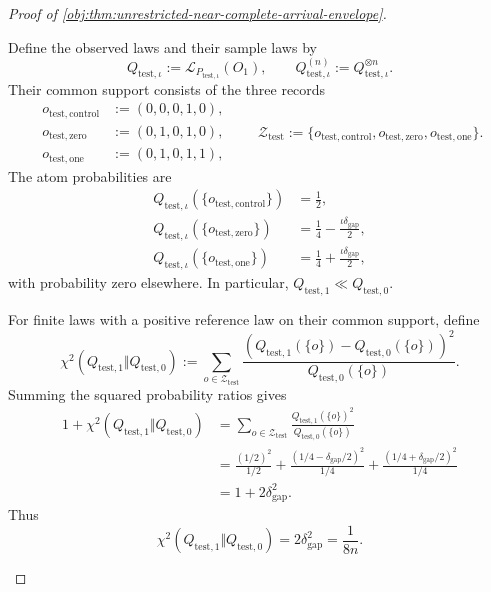 \documentclass[11pt]{article}
\begin{document}
\begin{proof}[Proof of \cref{obj:thm:unrestricted-near-complete-arrival-envelope}]
\begin{enumerate}
Define the observed laws and their sample laws by
\[
Q_{\mathrm{test},\iota}
:=\mathcal L_{P_{\mathrm{test},\iota}}(O_1),
\qquad
Q_{\mathrm{test},\iota}^{(n)}
:=Q_{\mathrm{test},\iota}^{\otimes n}.
\]
Their common support consists of the three records
\[
\begin{aligned}
o_{\mathrm{test},\mathrm{control}}&:=(0,0,0,1,0),\\
o_{\mathrm{test},\mathrm{zero}}&:=(0,1,0,1,0),\\
o_{\mathrm{test},\mathrm{one}}&:=(0,1,0,1,1),
\end{aligned}
\qquad
\mathcal Z_{\mathrm{test}}
:=
\{o_{\mathrm{test},\mathrm{control}},
o_{\mathrm{test},\mathrm{zero}},
o_{\mathrm{test},\mathrm{one}}\}.
\]
The atom probabilities are
\[
\begin{aligned}
Q_{\mathrm{test},\iota}(\{o_{\mathrm{test},\mathrm{control}}\})&=\frac12,\\
Q_{\mathrm{test},\iota}(\{o_{\mathrm{test},\mathrm{zero}}\})&=\frac14-\frac{\iota\delta_{\mathrm{gap}}}{2},\\
Q_{\mathrm{test},\iota}(\{o_{\mathrm{test},\mathrm{one}}\})&=\frac14+\frac{\iota\delta_{\mathrm{gap}}}{2},
\end{aligned}
\]
with probability zero elsewhere. In particular,
\(Q_{\mathrm{test},1}\ll Q_{\mathrm{test},0}\).

For finite laws with a positive reference law on their common support, define
\[
\chi^2(Q_{\mathrm{test},1}\Vert Q_{\mathrm{test},0})
:=
\sum_{o\in\mathcal Z_{\mathrm{test}}}
\frac{
\left(Q_{\mathrm{test},1}(\{o\})-Q_{\mathrm{test},0}(\{o\})\right)^2
}{
Q_{\mathrm{test},0}(\{o\})
}.
\]
Summing the squared probability ratios gives
\[
\begin{aligned}
1+\chi^2(Q_{\mathrm{test},1}\Vert Q_{\mathrm{test},0})
&=
\sum_{o\in\mathcal Z_{\mathrm{test}}}
\frac{Q_{\mathrm{test},1}(\{o\})^2}{Q_{\mathrm{test},0}(\{o\})}\\
&=
\frac{(1/2)^2}{1/2}
+
\frac{(1/4-\delta_{\mathrm{gap}}/2)^2}{1/4}
+
\frac{(1/4+\delta_{\mathrm{gap}}/2)^2}{1/4}\\
&=1+2\delta_{\mathrm{gap}}^2.
\end{aligned}
\]
Thus
\[
\chi^2(Q_{\mathrm{test},1}\Vert Q_{\mathrm{test},0})
=2\delta_{\mathrm{gap}}^2=\frac1{8n}.
\]


\end{enumerate}
\end{proof}
\end{document}

